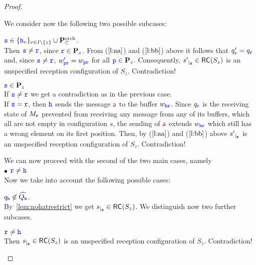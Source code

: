 \begin{proof}
\begin{description}
We consider now the following two possible subcases:
\begin{description}
\item
 $\tts \in\Set{\HH_v}_{v\in I\setminus\Set{z}}\cup\rolescsint$.  \\
Then $\tts \neq \ttr$, since $\ttr \in \roles_z$.
From ($\ref{l:aa}$) and ($\ref{l:bb}$) above it follows that  $q'_\ttr = {q}_\ttr$
and, since  $\tts \neq \ttr$, $w'_{\ttp\ttr} = {w}_{\ttp\ttr}$ for all $\ttp \in \roles_z.$ Consequently, $\restrict{s'}{z} \in \RS(S_z)$ is an unspecified reception configuration of $S_z$. Contradiction!
\item
$\tts \in \roles_z$\\
If $\tts \neq \ttr$ we get a contradiction as in the previous case.\\
If $\tts = \ttr$, then $\HH$ sends the message $\msg[a]$ to the buffer $w_{\HH\ttr}$. Since $q_\ttr$ is the receiving state of $M_\ttr$ prevented from receiving any message from any of its buffers, which all are not empty in configuration $s$, the sending of $\msg[a]$ extends $w_{\HH\ttr}$ which still has a wrong element on its first position. Then, by ($\ref{l:aa}$) and ($\ref{l:bb}$) above $\restrict{s'}{z}$ is an unspecified reception configuration of $S_z$.  Contradiction!
\end{description}
\end{description}
We can now proceed with the second of the two main cases, namely\\[2mm]
$\bullet$ $\ttr \neq\hh$\\
Now we  take into account the following possible cases:

\begin{description}
%
\item 
${q}_\HH\not\in \widehat{Q_\HH}$.\\ 
By~\cref{lem:nohatrestrict} we get $\restrict{s}{z}\in \RS(S_z)$.
We distinguish now two further subcases.
\begin{description}
\item 
$\ttr \neq \HH$\\
Then $\restrict{s}{z}\in \RS(S_z)$ is an unspecified reception configuration of
$S_z$. Contradiction!
\end{description}
\end{description}


\end{proof}
